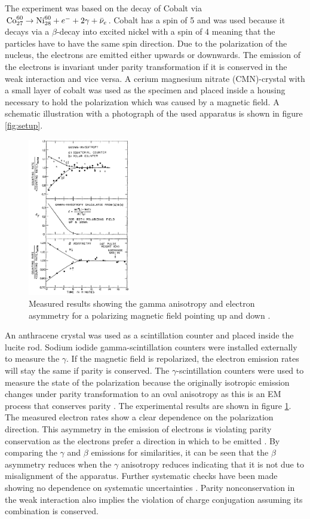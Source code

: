 The experiment was based on the decay of Cobalt via $\text{Co}^{60}_{27}\rightarrow \text{Ni}^{60}_{28}+e^-+2\gamma+\bar\nu_e$.
Cobalt has a spin of 5 and was used because it decays via a $\beta$-decay into excited nickel with a spin of 4 meaning that the particles have to have the same spin direction.
Due to the polarization of the nucleus, the electrons are emitted either upwards or downwards.
The emission of the electrons is invariant under parity transformation if it is conserved in the weak interaction and vice versa.
A cerium magnesium nitrate (CMN)-crystal with a small layer of cobalt was used as the specimen and placed inside a housing necessary to hold the polarization \cite{CaseStudies} which was caused by a magnetic field.
A schematic illustration with a photograph of the used apparatus is shown in figure \ref{fig:setup}.
\begin{figure}
    \centering
    \includegraphics[width=0.4\textwidth]{figs/resultsWu.png}
    \caption{Measured results showing the gamma anisotropy and electron asymmetry for a polarizing magnetic field pointing up and down \cite{PhysRev.105.1413}.}
    \label{fig:resultsWu}
\end{figure}
An anthracene crystal was used as a scintillation counter and placed inside the lucite rod.
Sodium iodide gamma-scintillation counters were installed externally to measure the $\gamma$.
If the magnetic field is repolarized, the electron emission rates will stay the same if parity is conserved.
The $\gamma$-scintillation counters were used to measure the state of the polarization because the originally isotropic emission changes under parity transformation to an oval anisotropy as this is an EM process that conserves parity \cite{CaseStudies}.
The experimental results are shown in figure \ref{fig:resultsWu}.
The measured electron rates show a clear dependence on the polarization direction.
This asymmetry in the emission of electrons is violating parity conservation as the electrons prefer a direction in which to be emitted \cite{PhysRev.105.1413}.
By comparing the $\gamma$ and $\beta$ emissions for similarities, it can be seen that the $\beta$ asymmetry reduces when the $\gamma$ anisotropy reduces indicating that it is not due to misalignment of the apparatus.
Further systematic checks have been made showing no dependence on systematic uncertainties \cite{CaseStudies}.
Parity nonconservation in the weak interaction also implies the violation of charge conjugation assuming its combination is conserved.

